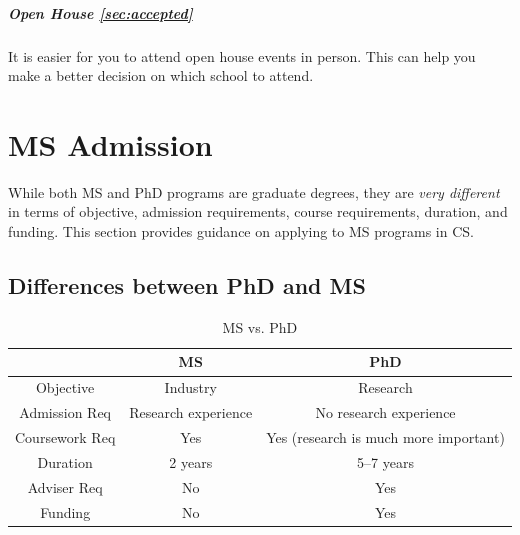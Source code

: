 \documentclass[oneside,11pt,dvipsnames]{book}
\newenvironment{domesticbox}[1][]{
  \small
  \begin{mydomesticbox}
    {\small \textbf{#1}}
  }{
  \end{mydomesticbox}
}
\def\chapterinfo#1{%
  \addcontentsline{toc}{chapterinfo}{%
    \noexpand\numberline{}\color{black}{#1}}%
}
\begin{document}
\paragraph{Open House \autoref{sec:accepted}} It is easier for you to attend open house events in person.  This can help you make a better decision on which school to attend.


\chapter{MS Admission}\label{chap:ms}
\chapterinfo{MS focuses on coursework and prepares you for industry, while PhD focuses on research and prepares you for academia or research.}

While both MS and PhD programs are graduate degrees, they are \emph{very different} in terms of objective, admission requirements, course requirements, duration, and funding. This section provides guidance on applying to MS programs in CS.

\section{Differences between PhD and MS}


\begin{table}
    \caption{MS vs. PhD}\label{tab:phd-vs-ms}
    \centering
    \small
    \begin{tabular}{c|c|c}
    \toprule
    \textbf{} & \textbf{MS} & \textbf{PhD} \\
    \midrule
    Objective & Industry & Research \\
    Admission Req & Research experience & No research experience \\
    Coursework Req & Yes & Yes (research is much more important)  \\
    Duration & 2 years & 5--7 years \\
    Adviser Req & No & Yes \\
    Funding & No & Yes \\
    \bottomrule
    \end{tabular}
  \end{table}
\end{document}
